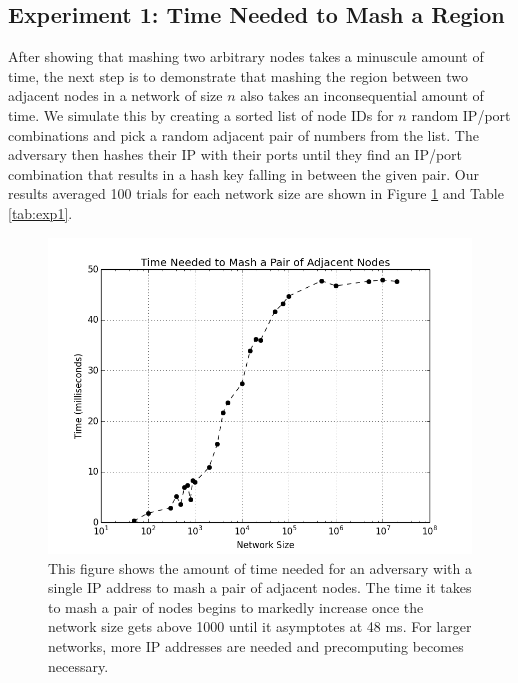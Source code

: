 \subsection{Experiment 1:  Time Needed to Mash a Region}
\label{sec:exp1}
After showing that mashing two arbitrary nodes takes a minuscule amount of time, the next step is to demonstrate that mashing the region between two adjacent nodes in a network of size $n$ also takes an inconsequential amount of time.
We simulate this by creating a sorted list of node IDs for $n$ random IP/port combinations and pick a random adjacent pair of numbers from the list.
The adversary then hashes their IP with their ports until they find an IP/port combination that results in a hash key falling in between the given pair.
Our results averaged 100 trials for each network size are shown in Figure \ref{fig:exp1} and Table \ref{tab:exp1}.

\begin{figure}
	\centering
	\includegraphics[width=\linewidth]{figs/size_time}
	\caption{This figure shows the amount of time needed for an adversary with a single IP address to mash a pair of adjacent nodes.  The time it takes to mash a pair of nodes begins to markedly increase once the network size gets above 1000 until it asymptotes at 48 ms.  For larger networks, more IP addresses are needed and precomputing becomes necessary.}
	\label{fig:exp1}
\end{figure}


